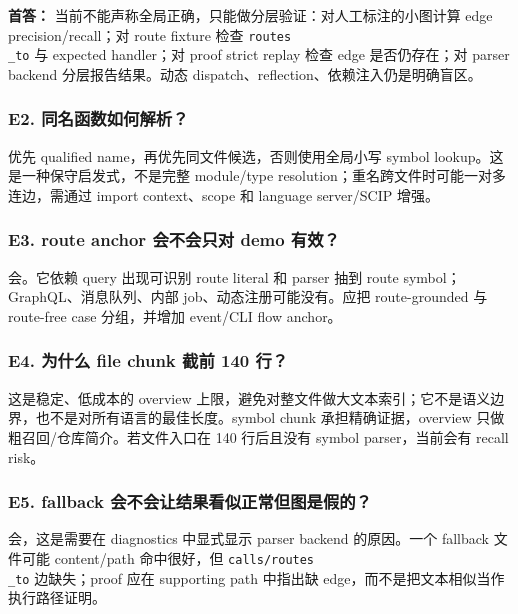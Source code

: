 \documentclass[UTF8,12pt,openany]{ctexbook}
\begin{document}
\textbf{首答：} 当前不能声称全局正确，只能做分层验证：对人工标注的小图计算 edge precision/recall；对 route fixture 检查 \texttt{routes\\_to} 与 expected handler；对 proof strict replay 检查 edge 是否仍存在；对 parser backend 分层报告结果。动态 dispatch、reflection、依赖注入仍是明确盲区。\par

\subsubsection{E2. 同名函数如何解析？}

优先 qualified name，再优先同文件候选，否则使用全局小写 symbol lookup。这是一种保守启发式，不是完整 module/type resolution；重名跨文件时可能一对多连边，需通过 import context、scope 和 language server/SCIP 增强。\par

\subsubsection{E3. route anchor 会不会只对 demo 有效？}

会。它依赖 query 出现可识别 route literal 和 parser 抽到 route symbol；GraphQL、消息队列、内部 job、动态注册可能没有。应把 route-grounded 与 route-free case 分组，并增加 event/CLI flow anchor。\par

\subsubsection{E4. 为什么 file chunk 截前 140 行？}

这是稳定、低成本的 overview 上限，避免对整文件做大文本索引；它不是语义边界，也不是对所有语言的最佳长度。symbol chunk 承担精确证据，overview 只做粗召回/仓库简介。若文件入口在 140 行后且没有 symbol parser，当前会有 recall risk。\par

\subsubsection{E5. fallback 会不会让结果看似正常但图是假的？}

会，这是需要在 diagnostics 中显式显示 parser backend 的原因。一个 fallback 文件可能 content/path 命中很好，但 \texttt{calls/routes\\_to} 边缺失；proof 应在 supporting path 中指出缺 edge，而不是把文本相似当作执行路径证明。\par
\end{document}

